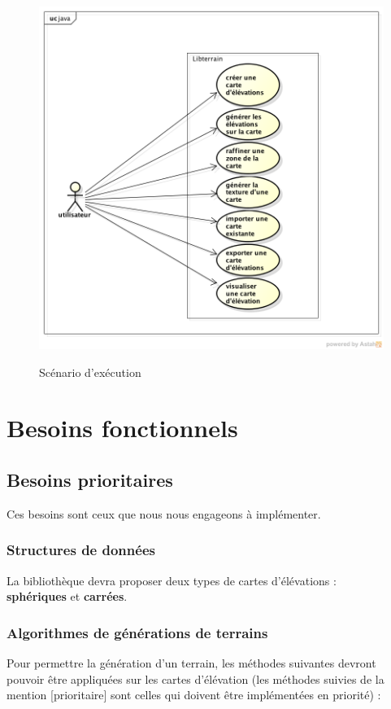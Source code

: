 \begin{figure}[!ht]
    \begin{center}
        \includegraphics[width=15cm]{resources/use-case.png}
        \label{fig:use_case}
        \caption{Scénario d'exécution}
    \end{center}
\end{figure}

\section{Besoins fonctionnels}

\subsection{Besoins prioritaires}

Ces besoins sont ceux que nous nous engageons à implémenter.

\subsubsection{Structures de données}
La bibliothèque devra proposer deux types de cartes d'élévations :\\
\textbf{sphériques} et \textbf{carrées}.

\subsubsection{Algorithmes de générations de terrains}
Pour permettre la génération d'un terrain, les méthodes suivantes devront pouvoir
 être appliquées sur les cartes d'élévation (les méthodes suivies de la mention [prioritaire] sont celles qui doivent \^etre implémentées en priorité) :\\

